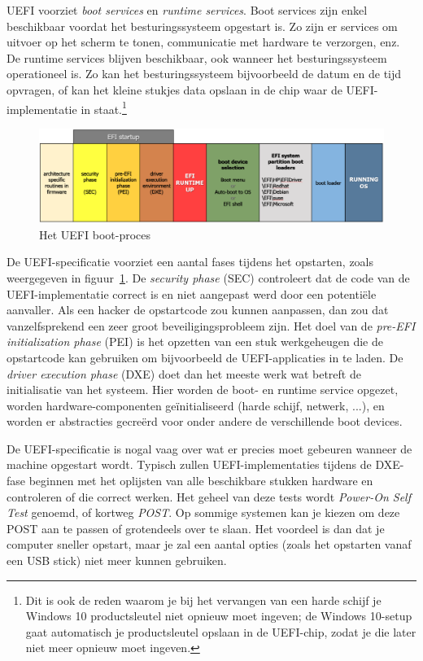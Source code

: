UEFI voorziet \emph{boot services} en \emph{runtime services}. Boot services zijn enkel beschikbaar voordat het besturingssysteem opgestart is. Zo zijn er services om uitvoer op het scherm te tonen, communicatie met hardware te verzorgen, enz. De runtime services blijven beschikbaar, ook wanneer het besturingssysteem operationeel is. Zo kan het besturingssysteem bijvoorbeeld de datum en de tijd opvragen, of kan het kleine stukjes data opslaan in de chip waar de UEFI-implementatie in staat.\footnote{Dit is ook de reden waarom je bij het vervangen van een harde schijf je Windows 10 productsleutel niet opnieuw moet ingeven; de Windows 10-setup gaat automatisch je productsleutel opslaan in de UEFI-chip, zodat je die later niet meer opnieuw moet ingeven.}

\begin{figure}
\centering
\includegraphics[scale=.25]{images/uefisartup.png}
\caption{Het UEFI boot-proces}
\label{uefiboot}
\end{figure}

De UEFI-specificatie voorziet een aantal fases tijdens het opstarten, zoals weergegeven in figuur~\ref{uefiboot}.
De \emph{security phase} (SEC) controleert dat de code van de UEFI-implementatie correct is en niet aangepast
werd door een potenti\"ele aanvaller. Als een hacker de opstartcode zou kunnen aanpassen, dan zou dat vanzelfsprekend
een zeer groot beveiligingsprobleem zijn. Het doel van de \emph{pre-EFI initialization phase} (PEI) is het opzetten van
een stuk werkgeheugen die de opstartcode kan gebruiken om bijvoorbeeld de UEFI-applicaties in te laden. De \emph{driver
execution phase} (DXE) doet dan het meeste werk wat betreft de initialisatie van het systeem. Hier worden de boot- en
runtime service opgezet, worden hardware-componenten ge\"initialiseerd (harde schijf, netwerk, ...), en worden er abstracties
gecre\"erd voor onder andere de verschillende boot devices. 

De UEFI-specificatie is nogal vaag over wat er precies moet gebeuren wanneer de machine opgestart wordt. Typisch zullen
UEFI-implementaties tijdens de DXE-fase beginnen met het oplijsten van alle beschikbare stukken hardware en controleren
of die correct werken. Het geheel van deze tests wordt \emph{Power-On Self Test} genoemd, of
kortweg \emph{POST}. Op sommige systemen kan je kiezen om deze POST aan te passen of grotendeels over te slaan. Het
voordeel is dan dat je computer sneller opstart, maar je zal een aantal opties (zoals het opstarten vanaf een USB stick)
niet meer kunnen gebruiken.

